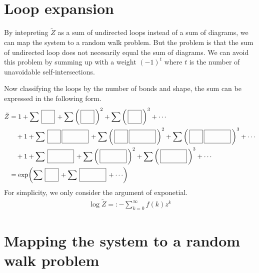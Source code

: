 \documentclass[aps, 12pt]{revtex4-2}
\begin{document}
\section{Loop expansion}
By intepreting $\tilde{Z}$ as a sum of undirected loops instead of a sum of diagrams, we can map the system to a random walk problem. But the problem is that the sum of undirected loop does not necesarily equal the sum of diagrams. We can avoid this problem by summing up with a weight $(-1)^t$ where $t$ is the number of unavoidable self-intersections.

Now classifying the loops by the number of bonds and shape, the sum can be expressed in the following form.
\begin{align*}
  \tilde{Z} &= 1 + \sum \raisebox{-2.5mm}{\,\square\,} + \sum \qty(\raisebox{-2.5mm}{\,\square\,})^2 + \sum \qty(\raisebox{-2.5mm}{\,\square\,})^3 + \cdots \\
            & \quad + 1 + \sum \raisebox{-2.5mm}{\,\square\,\rectangle\,} + \sum \qty(\raisebox{-2.5mm}{\,\square\,\rectangle\,})^2 + \sum \qty(\raisebox{-2.5mm}{\,\square\,\rectangle\,})^3 + \cdots \\
  & \quad + 1 + \sum \raisebox{-2.5mm}{\,\rectangle\,} + \sum \qty(\raisebox{-2.5mm}{\,\rectangle\,})^2 + \sum \qty(\raisebox{-2.5mm}{\,\rectangle\,})^3 + \cdots \\
  &= \exp(\sum \raisebox{-2.5mm}{\,\square\,} + \sum \raisebox{-2.5mm}{\,\rectangle\,} + \cdots)
\end{align*}
For simplicity, we only consider the argument of exponetial.
\begin{align*}
  \log \tilde{Z} =: - \sum_{k = 0}^{\infty} f(k)z^k
\end{align*}


\section{Mapping the system to a random walk problem}

\end{document}
